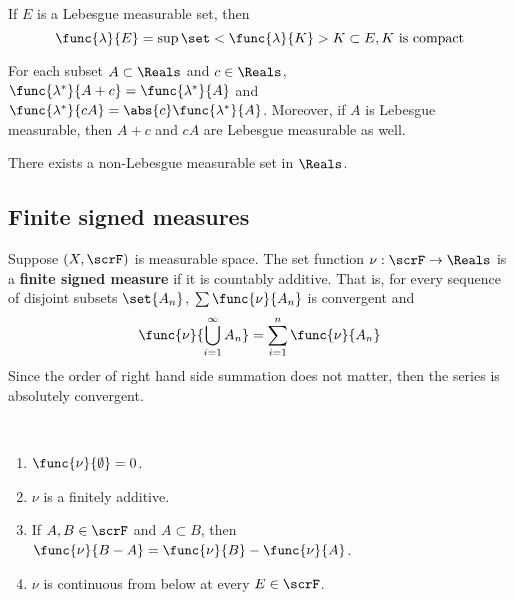 \begin{theorem}
    If \(E\) is a Lebesgue measurable set, then 
    \begin{equation*}
        \func{\lambda}{E} = \sup \set<\func{\lambda}{K}>{K \subset E, K \text{ is compact}}
    \end{equation*}
\end{theorem}

\begin{theorem}
    For each subset \(A \subset \Reals\) and \(c \in \Reals\), \(\func{\lambda^{\ast}}{A + c} = \func{\lambda^{\ast}}{A}\) and \(\func{\lambda^{\ast}}{cA} = \abs{c} \func{\lambda^{\ast}}{A}\). Moreover, if \(A\) is Lebesgue measurable, then \(A + c\) and \(cA\) are Lebesgue measurable as well.
\end{theorem}

\begin{theorem}
    There exists a non-Lebesgue measurable set in \(\Reals\).
\end{theorem}

\subsection{Finite signed measures}

\begin{definition}
    Suppose \((X,\scrF)\) is measurable space. The set function \(\nu: \scrF \to \Reals\) is a \textbf{finite signed measure}  if it is countably additive. That is, for every sequence of disjoint subsets \(\set{A_n}\), \(\sum \func{\nu}{A_n}\) is convergent and 
    \begin{equation*}
        \func{\nu}{\bigcup_{i = 1}^{\infty} A_n} = \sum_{i = 1}^n \func{\nu}{A_n}
    \end{equation*}
    Since the order of right hand side summation does not matter, then the series is absolutely convergent.
\end{definition}

\begin{proposition}
    \ 
    \begin{enumerate}
        \item \(\func{\nu}{\emptyset} = 0\).
        \item \(\nu\) is a finitely additive.
        \item If \(A,B \in \scrF\) and \(A \subset B\), then \(\func{\nu}{B - A} = \func{\nu}{B} - \func{\nu}{A}\).
        \item \(\nu\) is continuous from below at every \(E \in \scrF\).
    \end{enumerate}
\end{proposition}

